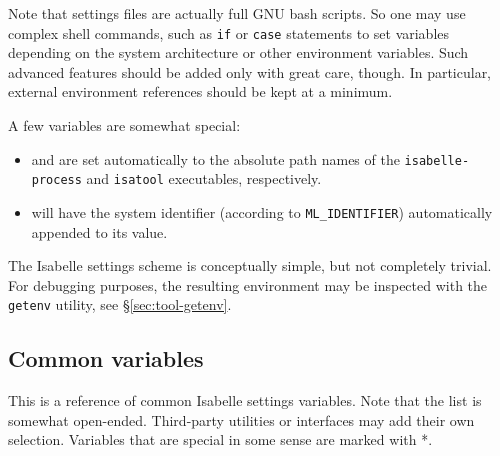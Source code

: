 Note that settings files are actually full GNU bash scripts. So one may use
complex shell commands, such as \texttt{if} or \texttt{case} statements to set
variables depending on the system architecture or other environment variables.
Such advanced features should be added only with great care, though. In
particular, external environment references should be kept at a minimum.

\medskip A few variables are somewhat special:
\begin{itemize}
\item {} and  are set automatically to the
  absolute path names of the \texttt{isabelle-process} and \texttt{isatool}
  executables, respectively.
  
\item {} will have the {\ML} system identifier
  (according to \texttt{ML_IDENTIFIER}) automatically appended to its value.
\end{itemize}

\medskip The Isabelle settings scheme is conceptually simple, but not
completely trivial.  For debugging purposes, the resulting environment may be
inspected with the \texttt{getenv} utility, see \S\ref{sec:tool-getenv}.


\subsection{Common variables}

This is a reference of common Isabelle settings variables. Note that the list
is somewhat open-ended. Third-party utilities or interfaces may add their own
selection. Variables that are special in some sense are marked with *.

